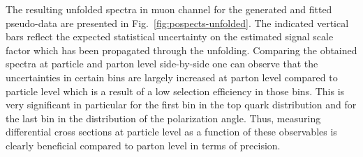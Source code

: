 {\hspace{0.03\textwidth}
}

The resulting unfolded spectra in muon channel for the generated and fitted pseudo-data are presented in Fig.~\ref{fig:pospects-unfolded}. The indicated vertical bars reflect the expected statistical uncertainty on the estimated signal scale factor which has been propagated through the unfolding. Comparing the obtained spectra at particle and parton level side-by-side one can observe that the uncertainties in certain bins are largely increased at parton level compared to particle level which is a result of a low selection efficiency in those bins. This is very significant in particular for the first bin in the top quark \pt distribution and for the last bin in the distribution of the polarization angle. Thus, measuring differential cross sections at particle level as a function of these observables is clearly beneficial compared to parton level in terms of precision.

